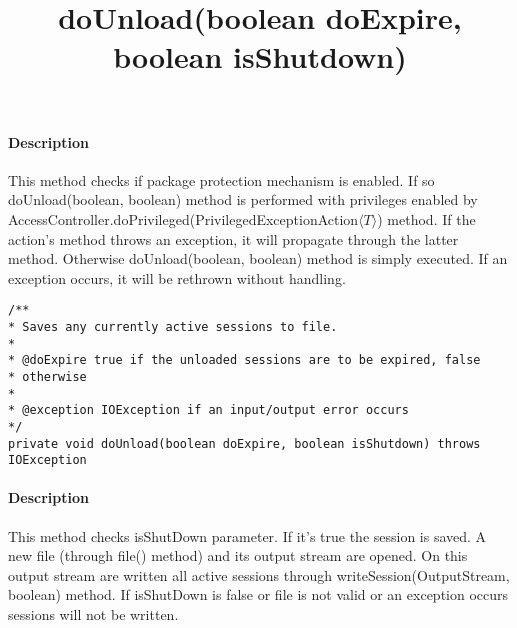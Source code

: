 \paragraph{Description} This method checks if package protection mechanism is enabled. If so doUnload(boolean, boolean) method is performed with privileges enabled by AccessController.doPrivileged(PrivilegedExceptionAction$\langle T \rangle$) method. If the action's method throws an exception, it will propagate through the latter method. Otherwise doUnload(boolean, boolean) method is simply executed. If an exception occurs, it will be rethrown without handling.\\

\title{{\large \textbf{doUnload(boolean doExpire, boolean isShutdown)}}}
\lstset{firstnumber=657}
\begin{lstlisting}
/**
* Saves any currently active sessions to file.
*
* @doExpire true if the unloaded sessions are to be expired, false
* otherwise
*
* @exception IOException if an input/output error occurs
*/
private void doUnload(boolean doExpire, boolean isShutdown) throws IOException
\end{lstlisting}
\paragraph{Description} This method checks isShutDown parameter. If it's true the session is saved. A new file (through file() method) and its output stream are opened. On this output stream are written all active sessions through writeSession(OutputStream, boolean) method. If isShutDown is false or file is not valid or an exception occurs sessions will not be written.

